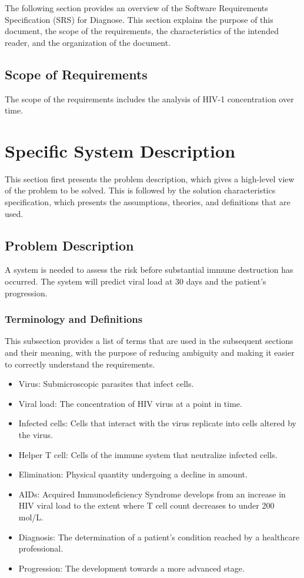 \documentclass[12pt]{article}
\begin{document}
The following section provides an overview of the Software Requirements Specification (SRS) for Diagnose. This section explains the purpose of this document, the scope of the requirements, the characteristics of the intended reader, and the organization of the document.

\subsection{Scope of Requirements}
\label{Sec:ReqsScope}
The scope of the requirements includes the analysis of HIV-1 concentration over time.

\section{Specific System Description}
\label{Sec:SpecSystDesc}
This section first presents the problem description, which gives a high-level view of the problem to be solved. This is followed by the solution characteristics specification, which presents the assumptions, theories, and definitions that are used.

\subsection{Problem Description}
\label{Sec:ProbDesc}
A system is needed to assess the risk before substantial immune destruction has occurred. The system will predict viral load at 30 days and the patient's progression.

\subsubsection{Terminology and Definitions}
\label{Sec:TermDefs}
This subsection provides a list of terms that are used in the subsequent sections and their meaning, with the purpose of reducing ambiguity and making it easier to correctly understand the requirements.

\begin{itemize}
\item{Virus: Submicroscopic parasites that infect cells.}
\item{Viral load: The concentration of HIV virus at a point in time.}
\item{Infected cells: Cells that interact with the virus replicate into cells altered by the virus.}
\item{Helper T cell: Cells of the immune system that neutralize infected cells.}
\item{Elimination: Physical quantity undergoing a decline in amount.}
\item{AIDs: Acquired Immunodeficiency Syndrome develops from an increase in HIV viral load to the extent where T cell count decreases to under 200 mol/L.}
\item{Diagnosis: The determination of a patient's condition reached by a healthcare professional.}
\item{Progression: The development towards a more advanced stage.}
\end{itemize}
\end{document}
